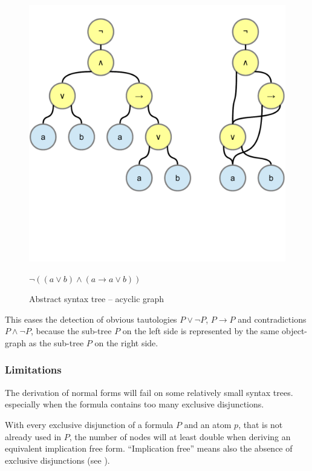 \begin{figure}[htb]
\begin{center}
\includegraphics[scale=0.5,trim=0cm 5.4cm 0cm 1cm,clip=true]{diagrams/AcyclicSyntaxGraph.pdf}
\caption{Abstract syntax tree – acyclic graph }{$\neg( (a\vee b) \wedge (a \rightarrow a\vee b))$}
\label{fig:AST+ASG}
\end{center}
\end{figure}

This eases the detection of obvious tautologies $P \vee \neg P$, $P \rightarrow P$ and contradictions $P \wedge \neg P$,
because the sub-tree $P$ on the left side is represented by the same object-graph as the sub-tree $P$ on the right side.

\subsubsection{Limitations}

The derivation of normal forms will fail on some relatively small syntax trees.
especially when the formula contains too many exclusive disjunctions.

With every exclusive disjunction of a formula $P$ and an atom $p$, 
that is not already used in $P$,
the number of nodes will at least double 
when deriving an equivalent implication free form.
“Implication free” means also the absence of exclusive disjunctions (see ).

